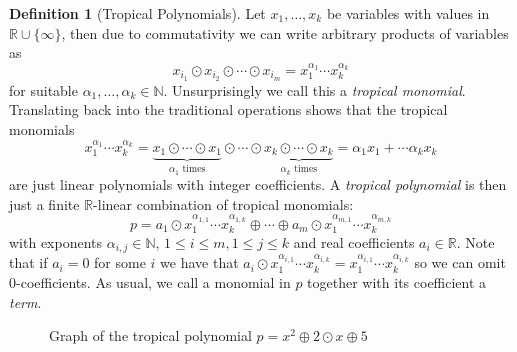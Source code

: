 \documentclass[
  paper=a4,
  DIV=14,
  fontsize=12pt,
  titlepage,
  bibliography=totoc,
  listof=totoc,
  pagesize=pdftex
]{scrartcl}
\numberwithin{figure}{section}
\numberwithin{equation}{section}
\numberwithin{table}{section}
\newcommand*\setR{\mathds{R}}
\newcommand*\setN{\mathds{N}}
\theoremstyle{definition}
\newtheorem{definition}{Definition}
\numberwithin{definition}{section}
\begin{document}
\begin{definition}[Tropical Polynomials]
  Let $x_1, \dots, x_k$ be variables with values in $\setR\cup\{\infty\}$, then due to
  commutativity we can write arbitrary products of variables as
  \[
    x_{i_1} \odot x_{i_2} \odot \cdots \odot x_{i_m}
    = x_1^{\alpha_1} \cdots x_k^{\alpha_k}
  \]
  for suitable $\alpha_1, \dots, \alpha_k \in \setN$. Unsurprisingly we call this a
  \emph{tropical monomial}. Translating back into the traditional operations shows that
  the tropical monomials
  \[
    x_1^{\alpha_1} \cdots x_k^{\alpha_k} =
    \underbrace{x_1\odot\cdots\odot x_1}_{\alpha_1 \text{ times}}
    \odot\cdots\odot
    \underbrace{x_k\odot\cdots\odot x_k}_{\alpha_k \text{ times}}
    = \alpha_1x_1 + \cdots \alpha_kx_k
  \]
  are just linear polynomials with integer coefficients. A \emph{tropical polynomial} is
  then just a finite $\setR$-linear combination of tropical monomials:
  \[
    p = a_1 \odot x_1^{\alpha_{1,1}}\cdots x_k^{\alpha_{1,k}} \oplus \cdots \oplus
    a_m \odot x_1^{\alpha_{m,1}}\cdots x_k^{\alpha_{m,k}}
  \]
  with exponents $\alpha_{i,j} \in \setN$, $1\leq i \leq m, 1\leq j \leq k$ and real
  coefficients $a_i \in \setR$. Note that if $a_i = 0$ for some $i$ we have that $a_i\odot
  x_1^{\alpha_{i,1}}\cdots x_k^{\alpha_{i,k}} = x_1^{\alpha_{i,1}}\cdots
  x_k^{\alpha_{i,k}}$ so we can omit $0$-coefficients. As usual, we call a monomial in $p$
  together with its coefficient a \emph{term}.
  \label{def:tropPoly}
\end{definition}

\begin{figure}[tbh]
  \centering
  \caption{Graph of the tropical polynomial $p=x^2\oplus 2\odot x \oplus 5$}
  \label{fig:tropPolyPlot}
\end{figure}
\end{document}
